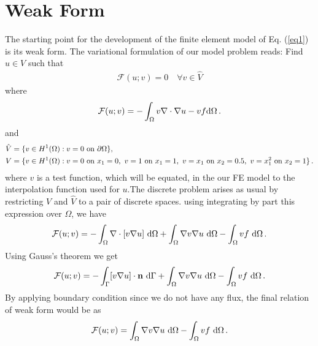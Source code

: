 \documentclass[]{article}
\begin{document}
\section{Weak Form} \label{sec: wf}
The starting point for the development of the finite element model of Eq. (\ref{eq1}) is its weak form.
The variational formulation of our model problem reads: Find $u \in V$ such that
\begin{equation}\label{eq2}
	\begin{aligned}
		\mathcal{F}(u;v) = 0 \quad \forall v \in \hat{V}
	\end{aligned}
\end{equation}
where
\begin{equation}\label{eq3}
	\begin{aligned}
		\mathcal{F}(u; v) =-\int_\Omega v \nabla \cdot \nabla u - v f \mathrm{d}\Omega\thinspace .
	\end{aligned}
\end{equation}
and
\begin{equation}\label{eq4}
	\begin{aligned}
		\hat{V} &= \{v \in H^1(\Omega) : v = 0 \text{ on } \partial \Omega\}, \\
		V &= \{v \in H^1(\Omega) : v = 0 \text{ on } x_1=0, \ v = 1\text{ on }x_1=1, \ v= x_1 \text{ on } x_2=0.5, \ v= x_1^2 \text{ on } x_2=1\}\thinspace.
	\end{aligned}
\end{equation}
where $v$ is a test function, which will be equated, in the our FE model to the interpolation function used for $u$.The discrete problem arises as usual by restricting $V$ and $\hat{V}$ to a pair of discrete spaces. using integrating by part this expression over $\Omega$, we have
\begin{equation}\label{eq5}
	\begin{aligned}[b]
		\mathcal{F}(u; v)=-\int_\Omega \nabla \cdot [v \nabla u] \ \mathrm{d} \Omega + \int_\Omega  \nabla v \nabla u \ \mathrm{d} \Omega - \int_\Omega vf \ \mathrm{d} \Omega\thinspace .
	\end{aligned}
\end{equation}
Using Gauss’s theorem we get
\begin{equation}\label{eq6}
	\begin{aligned}[b]
		\mathcal{F}(u; v)=-\int_\Gamma [v \nabla u] \cdot \mathbf{n} \ \mathrm{d} \Gamma + \int_\Omega  \nabla v \nabla u \ \mathrm{d} \Omega - \int_\Omega vf \ \mathrm{d} \Omega\thinspace.
	\end{aligned}
\end{equation}
By applying boundary condition since we do not have any flux, the final relation of weak form would be as
\begin{equation}\label{eq7}
	\begin{aligned}[b]
		\mathcal{F}(u; v)=\int_\Omega  \nabla v \nabla u \ \mathrm{d} \Omega - \int_\Omega vf \ \mathrm{d} \Omega\thinspace.
	\end{aligned}
\end{equation}
\end{document}
